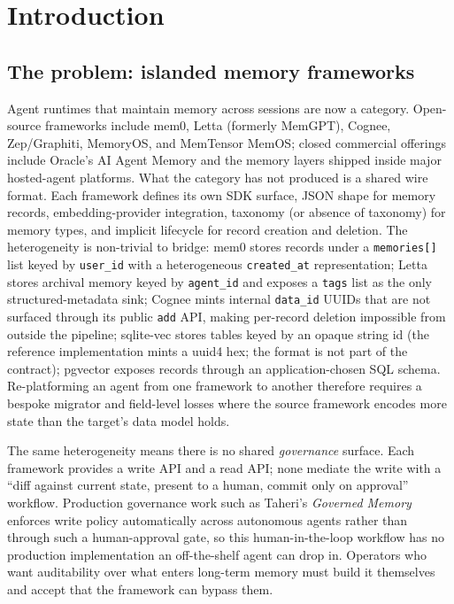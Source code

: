 \documentclass[11pt,letterpaper,twocolumn]{article}
\begin{document}
\section{Introduction}
\label{sec:intro}

\subsection{The problem: islanded memory frameworks}
\label{sec:intro-problem}

Agent runtimes that maintain memory across sessions are now a category. Open-source frameworks include mem0, Letta (formerly MemGPT), Cognee, Zep/Graphiti, MemoryOS, and MemTensor MemOS; closed commercial offerings include Oracle's AI Agent Memory and the memory layers shipped inside major hosted-agent platforms. What the category has not produced is a shared wire format. Each framework defines its own SDK surface, JSON shape for memory records, embedding-provider integration, taxonomy (or absence of taxonomy) for memory types, and implicit lifecycle for record creation and deletion. The heterogeneity is non-trivial to bridge: mem0 stores records under a \texttt{memories[]} list keyed by \texttt{user\_id} with a heterogeneous \texttt{created\_at} representation; Letta stores archival memory keyed by \texttt{agent\_id} and exposes a \texttt{tags} list as the only structured-metadata sink; Cognee mints internal \texttt{data\_id} UUIDs that are not surfaced through its public \texttt{add} API, making per-record deletion impossible from outside the pipeline; sqlite-vec stores tables keyed by an opaque string id (the reference implementation mints a uuid4 hex; the format is not part of the contract); pgvector exposes records through an application-chosen SQL schema. Re-platforming an agent from one framework to another therefore requires a bespoke migrator and field-level losses where the source framework encodes more state than the target's data model holds.

The same heterogeneity means there is no shared \emph{governance} surface. Each framework provides a write API and a read API; none mediate the write with a ``diff against current state, present to a human, commit only on approval'' workflow. Production governance work such as Taheri's \emph{Governed Memory}~\cite{taheri2026governed} enforces write policy automatically across autonomous agents rather than through such a human-approval gate, so this human-in-the-loop workflow has no production implementation an off-the-shelf agent can drop in. Operators who want auditability over what enters long-term memory must build it themselves and accept that the framework can bypass them.
\end{document}
